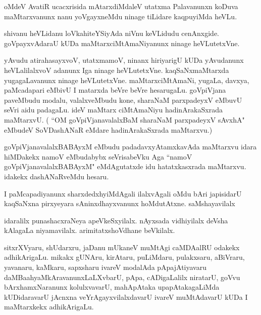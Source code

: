 \documentclass{article}
\begin{document}
\begin{mn}%
oMdeV AvatiR ucacxrisida mAtarxdiMdaleV utatxma Palavanunxn koDuva maMtarxvanunx nanu 
yoVgayxneMdu ninage tiLidare kaqpuyiMda heVLu.
\end{mn}

\begin{mn}%
shivanu heVLidanu loVkahiteYSiyAda niVnu keVLidudu cenAnxgide. goVpayxvAdaraU kUDa 
maMtarxciMtAmaNiyanunx ninage heVLutetxVne.
\end{mn}

\begin{mn}%
yAvudu atirahasayxvoV, utatxmamoV, ninanx hiriyarigU kUDa yAvudanunx heVLalilalxvoV adanunx 
Iga ninage heVLutetxVne. kaqSaNxmaMtarxda yugagaLavanunx ninage heVLutetxVne. 
maMtarxciMtAmaNi, yugaLa, davxya, paMcadapari eMbivU I matarxda beVre beVre hesarugaLu. 
goVpiVjana paveMbudu modalu, valalxveMbudu kone, sharaNaM parxpadeyxV eMbuvU seVri aidu 
padagaLu. ideV maMtarx ciMtAmaNiyu hadinArakaSxrada maMtarxvU. ( ``OM goVpiVjanavalalxBaM 
sharaNaM parxpadeyxV sAvxhA" eMbudeV SoVDashANaR eMdare hadinArakaSxrada maMtarxvu.)
\end{mn}

\begin{mn}%
goVpiVjanavalalxBABAyxM eMbudu padadavxyAtamxkavAda maMtarxvu idara hiMDakekx namoV 
eMbudabybx seVrisabeVku Aga ``namoV goVpiVjanavalalxBABAyxM" eMdAgutatxde idu 
hatatxkasxrada maMtarxvu. idakekx dashANaRveMdu hesaru.
\end{mn}

\begin{mn}%
I paMcapadiyanunx sharxdedxhyiMdAgali ilalxvAgali oMdu bAri japisidarU kaqSaNxna 
pirxyeyara sAninxdhayxvanunx hoMdutAtxne. saMshayavilalx 
\end{mn}

\begin{mn}%
idaralilx punashacxraNeya apeVkeSxyilalx. nAyxsada vidhiyilalx deVsha kAlagaLa 
niyamavilalx. arimitatxshoVdhane beVkilalx.
\end{mn}

\begin{mn}%
sitxrXVyaru, shUdarxru, jaDanu mUkaneV muMtAgi caMDAalRU odakekx adhikArigaLu. mikakx 
gUNAru, kirAtaru, puLiMdaru, pulakxsaru, aBiVraru, yavanaru, kaMkaru, sapxsharu ivareV 
modalAda pApajAtiyavaru daMBaahyaMkAravanunxLaLXvbarU, pApa, cADigaLalilx niratarU, goVvu 
bArxhamxNaranunx kolulxvavarU, mahApAtaka upapAtakagaLiMda kUDidaravarU jAcnxna 
veYrAgayxvilalxdavarU ivareV muMtAdavarU kUDa I maMtarxkekx adhikArigaLu.
\end{mn}
\end{document}
